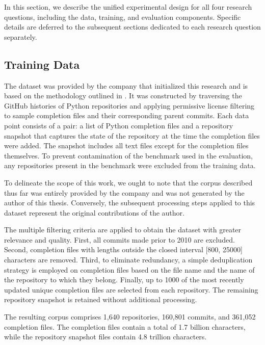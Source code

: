 In this section, we describe the unified experimental design for all four research questions, including the data, training, and evaluation components. Specific details are deferred to the subsequent sections dedicated to each research question separately.

\subsection{Training Data}

The dataset was provided by the company that initialized this research and is based on the methodology outlined in \citet{bogomolov2024}. It was constructed by traversing the GitHub histories of Python repositories and applying permissive license filtering to sample completion files and their corresponding parent commits. Each data point consists of a pair: a list of Python completion files and a repository snapshot that captures the state of the repository at the time the completion files were added. The snapshot includes all text files except for the completion files themselves. To prevent contamination of the benchmark used in the evaluation, any repositories present in the benchmark were excluded from the training data.

To delineate the scope of this work, we ought to note that the corpus described thus far was entirely provided by the company and was not generated by the author of this thesis. Conversely, the subsequent processing steps applied to this dataset represent the original contributions of the author.

The multiple filtering criteria are applied to obtain the dataset with greater relevance and quality. First, all commits made prior to 2010 are excluded. Second, completion files with lengths outside the closed interval [800, 25000] characters are removed. Third, to eliminate redundancy, a simple deduplication strategy is employed on completion files based on the file name and the name of the repository to which they belong. Finally, up to 1000 of the most recently updated unique completion files are selected from each repository. The remaining repository snapshot is retained without additional processing. \parencite{sapronov2025}

The resulting corpus comprises 1,640 repositories, 160,801 commits, and 361,052 completion files. The completion files contain a total of 1.7 billion characters, while the repository snapshot files contain 4.8 trillion characters.

